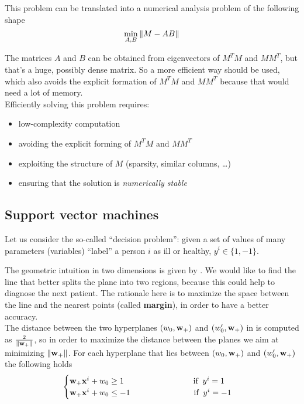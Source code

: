 \documentclass[computationalMathematics.tex]{subfiles}
\begin{document}
This problem can be translated into a numerical analysis problem of the following shape
\[
  \min_{A, B} \left\lVert M - AB\right\rVert
\]

The matrices $A$ and $B$ can be obtained from eigenvectors of $M^TM$ and $MM^T$, but that's a huge, possibly dense matrix. So a more efficient way should be used, which also avoids the explicit formation of $M^TM$ and $MM^T$ because that would need a lot of memory.\\

\noindent Efficiently solving this problem requires:
\begin{itemize}
    \item low-complexity computation
    \item avoiding the explicit forming of $M^T M$ and $MM^T$
    \item exploiting the structure of $M$ (sparsity, similar columns, \ldots )
    \item ensuring that the solution is \emph{numerically stable}
\end{itemize}

\subsection{Support vector machines}

Let us consider the so-called ``decision problem'': given a set of values of many parameters (variables) ``label'' a person $i$ as ill or healthy, $y^i \in \{1, -1\}$.

The geometric intuition in two dimensions is given by .
We would like to find the line that better splits the plane into two regions, because this could help to diagnose the next patient.
The rationale here is to maximize the space between the line and the nearest points (called \textbf{margin}), in order to have a better accuracy.\\

\noindent The distance between the two hyperplanes $(w_0, {\bf w }_+)$ and $(w'_0, {\bf w }_+)$ in  is computed as $\frac{2}{\left\lVert{\bf w }_+\right\rVert}$,  so in order to maximize the distance between the planes we aim at minimizing $\left\lVert{\bf w }_+\right\rVert$.
For each hyperplane that lies between $(w_0, {\bf w }_+)$ and $(w'_0, {\bf w }_+)$ the following holds
\[
	\begin{cases}
		\vect{w}_+ \vect{x}^i + w_0 \geq 1 \hspace{3cm} \text{if}\; \; y^i = 1\\
		\vect{w}_+ \vect{x}^i + w_0 \leq -1 \hspace{2.75cm} \text{if}\; \; y^i = -1
	\end{cases}
\]
    
\end{document}
